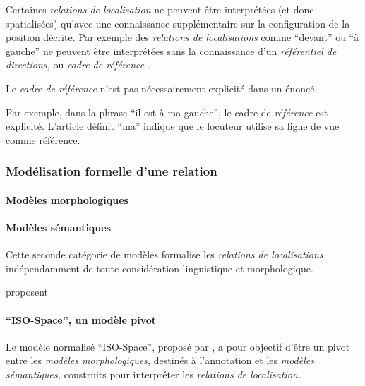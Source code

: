 

Certaines \emph{relations de localisation} ne peuvent être
interprétées (et donc spatialisées) qu'avec une connaissance
supplémentaire sur la configuration de la position décrite. Par
exemple des \emph{relations de localisations} comme \enquote{devant}
ou \enquote{à gauche} ne peuvent être interprétées sans la
connaissance d'un \emph{référentiel de directions,} ou \emph{cadre de
  référence} \autocite{Duchene2019}.

Le \emph{cadre de référence} n'est pas nécessairement explicité dans
un énoncé.

Par exemple, dans la phrase \enquote{il est à ma gauche}, le cadre de
\emph{référence} est explicité. L'article définit \enquote{ma} indique
que le locuteur utilise sa ligne de vue comme référence.

\subsubsection{Modélisation formelle d'une relation}

\paragraph{Modèles morphologiques}



\paragraph{Modèles sémantiques}

Cette seconde catégorie de modèles formalise les \emph{relations de
  localisations} indépendamment de toute considération linguistique
et morphologique.

\textcite{Aurngague1997} proposent

\autocite{Bateman2010}

\paragraph{\enquote{ISO-Space}, un modèle pivot}

Le modèle normalisé \enquote{ISO-Space}, proposé par
\textcite{Pustejovsky2017}, a pour objectif d'être un pivot entre les
\emph{modèles morphologiques,} destinés à l'annotation et les
\emph{modèles sémantiques,} construits pour interpréter les
\emph{relations de localisation.}

